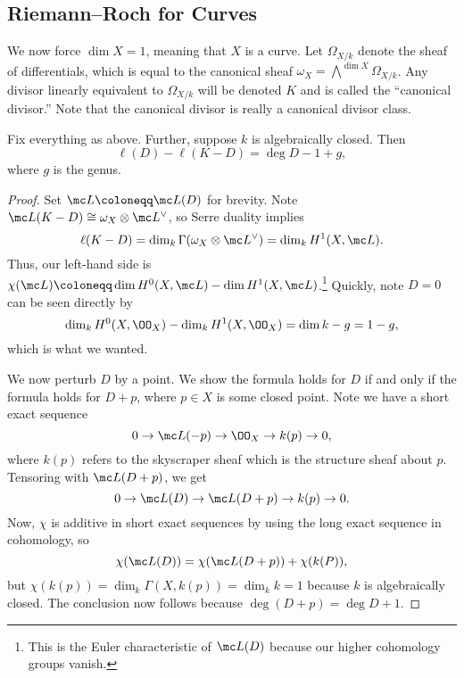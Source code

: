 \documentclass[../notes.tex]{subfiles}
\begin{document}
\subsection{Riemann--Roch for Curves}
We now force $\dim X=1$, meaning that $X$ is a curve. Let $\Omega_{X/k}$ denote the sheaf of differentials, which is equal to the canonical sheaf $\omega_X=\bigwedge^{\dim X}\Omega_{X/k}$. Any divisor linearly equivalent to $\Omega_{X/k}$ will be denoted $K$ and is called the ``canonical divisor.'' Note that the canonical divisor is really a canonical divisor class.
\begin{theorem}
	Fix everything as above. Further, suppose $k$ is algebraically closed. Then
	\[\ell(D)-\ell(K-D)=\deg D-1+g,\]
	where $g$ is the genus.
\end{theorem}
\begin{proof}
	Set $\mc L\coloneqq\mc L(D)$ for brevity. Note $\mc L(K-D)\cong\omega_X\otimes\mc L^\lor$, so Serre duality implies
	\[\ell(K-D)=\dim_k\Gamma(\omega_X\otimes\mc L^\lor)=\dim_kH^1(X,\mc L).\]
	Thus, our left-hand side is $\chi(\mc L)\coloneqq\dim H^0(X,\mc L)-\dim H^1(X,\mc L)$.\footnote{This is the Euler characteristic of $\mc L(D)$ because our higher cohomology groups vanish.} Quickly, note $D=0$ can be seen directly by
	\[\dim_kH^0(X,\OO_X)-\dim_kH^1(X,\OO_X)=\dim k-g=1-g,\]
	which is what we wanted.

	We now perturb $D$ by a point. We show the formula holds for $D$ if and only if the formula holds for $D+p$, where $p\in X$ is some closed point. Note we have a short exact sequence
	\[0\to\mc L(-p)\to\OO_X\to k(p)\to0,\]
	where $k(p)$ refers to the skyscraper sheaf which is the structure sheaf about $p$. Tensoring with $\mc L(D+p)$, we get
	\[0\to\mc L(D)\to\mc L(D+p)\to k(p)\to0.\]
	Now, $\chi$ is additive in short exact sequences by using the long exact sequence in cohomology, so
	\[\chi(\mc L(D))=\chi(\mc L(D+p))+\chi(k(P)),\]
	but $\chi(k(p))=\dim_k\Gamma(X,k(p))=\dim_kk=1$ because $k$ is algebraically closed. The conclusion now follows because $\deg(D+p)=\deg D+1$.
\end{proof}
\end{document}
